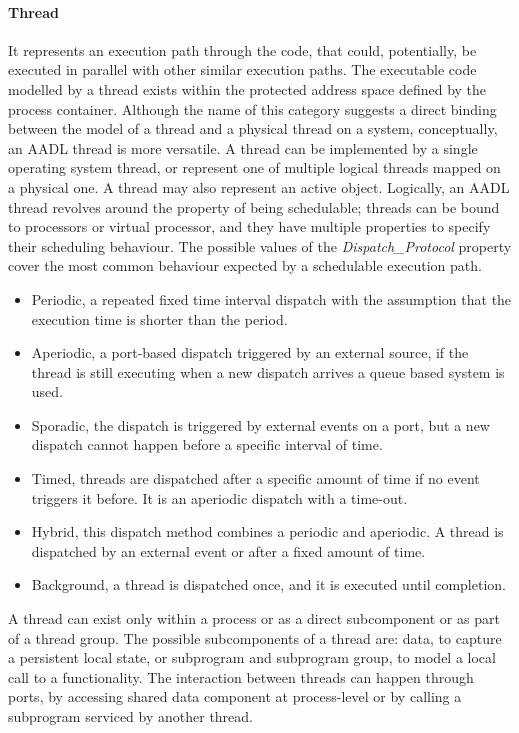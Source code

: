 \paragraph{Thread} It represents an execution path through the code, that could, potentially, be executed in parallel with other similar execution paths. The executable code modelled by a thread exists within the protected address space defined by the process container. Although the name of this category suggests a direct binding between the model of a thread and a physical thread on a system, conceptually, an AADL thread is more versatile. A thread can be implemented by a single operating system thread, or represent one of multiple logical threads mapped on a physical one. A thread may also represent an active object. Logically, an AADL thread revolves around the property of being schedulable; threads can be bound to processors or virtual processor, and they have multiple properties to specify their scheduling behaviour. The possible values of the \textit{Dispatch\_Protocol} property cover the most common behaviour expected by a schedulable execution path.
\begin{itemize}
\item Periodic, a repeated fixed time interval dispatch with the assumption that the execution time is shorter than the period.
\item Aperiodic, a port-based dispatch triggered by an external source, if the thread is still executing when a new dispatch arrives a queue based system is used.
\item Sporadic, the dispatch is triggered by external events on a port, but a new dispatch cannot happen before a specific interval of time.
\item Timed, threads are dispatched after a specific amount of time if no event triggers it before. It is an aperiodic dispatch with a time-out.
\item Hybrid, this dispatch method combines a periodic and aperiodic. A thread is dispatched by an external event or after a fixed amount of time.
\item Background, a thread is dispatched once, and it is executed until completion.
\end{itemize}
A thread can exist only within a process or as a direct subcomponent or as part of a thread group. The possible subcomponents of a thread are: data, to capture a persistent local state, or subprogram and subprogram group, to model a local call to a functionality. The interaction between threads can happen through ports, by accessing shared data component at process-level or by calling a subprogram serviced by another thread.

